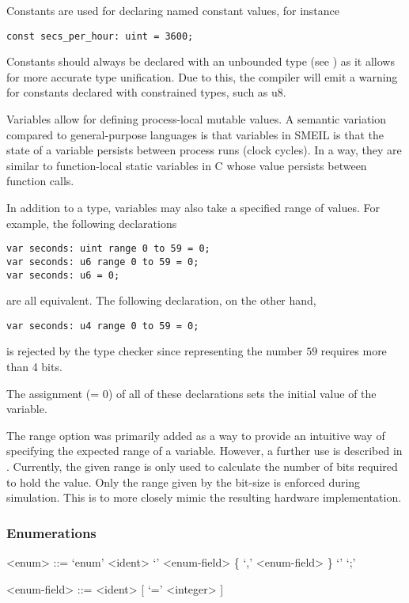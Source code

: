 Constants are used for declaring named constant values, for instance
\begin{lstlisting}[language=smeil]
const secs_per_hour: uint = 3600;
\end{lstlisting}
Constants should always be declared with an unbounded type (see
) as it allows for more accurate type unification. Due to
this, the compiler will emit a warning for constants declared with constrained
types, such as {\ttfamily u8}.

Variables allow for defining process-local mutable values. A semantic variation
compared to general-purpose languages is that variables in SMEIL is that the
state of a variable persists between process runs (clock cycles). In a way, they
are similar to function-local {\ttfamily static} variables in C whose value
persists between function calls.

In addition to a type, variables may also take a specified {\ttfamily range} of
values. For example, the following declarations
\begin{lstlisting}[language=smeil]
var seconds: uint range 0 to 59 = 0;
var seconds: u6 range 0 to 59 = 0;
var seconds: u6 = 0;
\end{lstlisting}
are all equivalent. The following declaration, on the other hand,
\begin{lstlisting}[language=smeil]
var seconds: u4 range 0 to 59 = 0;
\end{lstlisting}
is rejected by the type checker since representing the number $59$ requires more
than 4 bits.

The assignment ({\ttfamily = 0}) of all of these declarations sets the initial
value of the variable.

The {\ttfamily range} option was primarily added as a way to provide an
intuitive way of specifying the expected range of a variable. However, a further
use is described in . Currently, the given range is only used to
calculate the number of bits required to hold the value. Only the range given by
the bit-size is enforced during simulation. This is to more closely mimic the
resulting hardware implementation.

\subsubsection{Enumerations}
\begin{grammar}
<enum> ::= `enum' <ident> `{' <enum-field> \{ `,' <enum-field>  \} `}' `;'

<enum-field> ::= <ident> [ `=' <integer> ]
\end{grammar}

